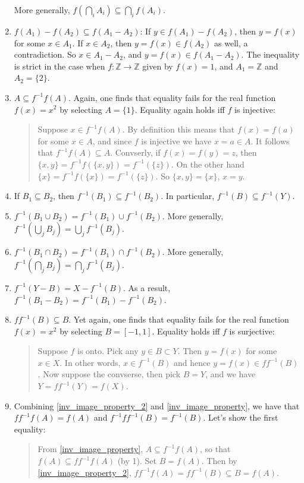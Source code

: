 \documentclass[12pt]{article}
\begin{document}
\begin{enumerate}
More generally, $f(\bigcap_i A_i)\subseteq \bigcap_i f(A_i)$.
\item $f(A_1)-f(A_2)\subseteq f(A_1-A_2)$: If $y\in f(A_1)-f(A_2)$, then $y=f(x)$ for some $x\in A_1$.  If $x\in A_2$, then $y=f(x)\in f(A_2)$ as well, a contradiction.  So $x\in A_1-A_2$, and $y=f(x)\in f(A_1-A_2)$.  The inequality is strict in the case when $f:\mathbb{Z}\to \mathbb{Z}$ given by $f(x)=1$, and $A_1=\mathbb{Z}$ and $A_2=\lbrace 2\rbrace$.
\item \label{inv_image_property} $A\subseteq f^{-1}f(A)$.  Again, one finds that equality fails for the real function $f(x)=x^2$ by selecting $A=\lbrace 1\rbrace$.  Equality again holds iff $f$ is injective:
\begin{quote}
Suppose $x \in f^{-1}f(A)$.  By definition this means that $f(x) = f(a)$ for some $x \in A$, and since $f$ is injective we have $x = a \in A$. It follows that $f^{-1}f(A) \subseteq A$.  Convserly, if $f(x)=f(y)=z$, then $\lbrace x,y\rbrace=f^{-1}f(\lbrace x,y\rbrace)=f^{-1}(\lbrace z\rbrace)$.  On the other hand $\lbrace x\rbrace =f^{-1}f(\lbrace x\rbrace)=f^{-1}(\lbrace z\rbrace)$.  So $\lbrace x,y\rbrace =\lbrace x\rbrace$, $x=y$.
\end{quote}
\item If $B_1\subseteq B_2$, then $f^{-1}(B_1)\subseteq f^{-1}(B_2)$.  In particular, $f^{-1}(B)\subseteq f^{-1}(Y)$.
\item $f^{-1}(B_1\cup B_2)=f^{-1}(B_1)\cup f^{-1}(B_2)$.  More generally, $f^{-1}(\bigcup_j B_j)=\bigcup_j f^{-1}(B_j)$.
\item $f^{-1}(B_1\cap B_2)=f^{-1}(B_1)\cap f^{-1}(B_2)$.  More generally, $f^{-1}(\bigcap_j B_j)=\bigcap_j f^{-1}(B_j)$.
\item $f^{-1}(Y-B)=X-f^{-1}(B)$.  As a result, $f^{-1}(B_1-B_2)=f^{-1}(B_1)-f^{-1}(B_2)$.
\item \label{inv_image_property_2} $ff^{-1}(B) \subseteq B$.  Yet again, one finds that equality fails for the real function $f(x)=x^2$ by selecting $B=[-1,1]$.  Equality holds iff $f$ is surjective:
\begin{quote}
Suppose $f$ is onto.  Pick any $y\in B\subset Y$.  Then $y=f(x)$ for some $x\in X$.  In other words, $x\in f^{-1}(B)$ and hence $y=f(x)\in ff^{-1}(B)$.  Now suppose the convserse, then pick $B=Y$, and we have $Y=ff^{-1}(Y)=f(X)$.
\end{quote}
\item \label{quasi_inverse_property} Combining \ref{inv_image_property_2} and \ref{inv_image_property}, we have that $ff^{-1}f(A)=f(A)$ and $f^{-1}ff^{-1}(B)=f^{-1}(B)$.  Let's show the first equality:
\begin{quote}
From \ref{inv_image_property}, $A\subseteq f^{-1}f(A)$, so that $f(A)\subseteq ff^{-1}f(A)$ (by 1).  Set $B=f(A)$.  Then by \ref{inv_image_property_2}, $ff^{-1}f(A)=ff^{-1}(B)\subseteq B=f(A)$.
\end{quote}
\end{enumerate}
\end{document}
